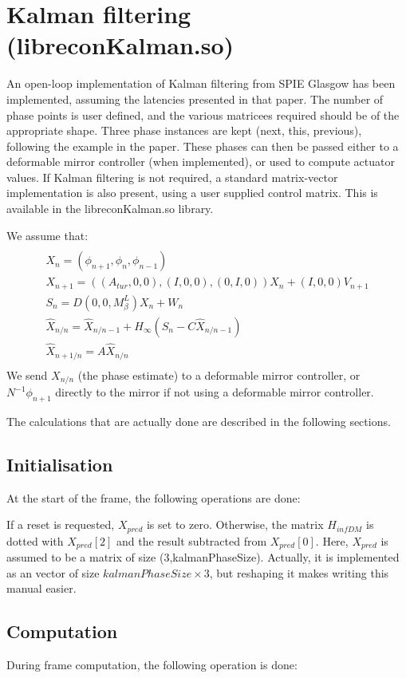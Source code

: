 \documentclass[a4,10pt]{article}
\begin{document}
\section{Kalman filtering (libreconKalman.so)}
\label{sect:kalman}
An open-loop implementation of Kalman filtering from SPIE Glasgow has
been implemented, assuming the latencies presented in that paper.  The
number of phase points is user defined, and the various matricees
required should be of the appropriate shape.  Three phase instances
are kept (next, this, previous), following the example in the paper.
These phases can then be passed either to a deformable mirror
controller (when implemented), or used to compute actuator values.  If
Kalman filtering is not required, a standard matrix-vector
implementation is also present, using a user supplied control matrix.
This is available in the libreconKalman.so library.


We assume that:
\begin{multline}\\
X_n=(\phi_{n+1},\phi_{n},\phi_{n-1})\\
X_{n+1} = ((A_{tur}, 0, 0), (I, 0, 0), (0, I, 0)) X_n + (I, 0, 0)
V_{n+1}\\
S_n = D (0, 0, M_\beta^L) X_n + W_n\\
\hat{X}_{n/n} = \hat{X}_{n/n-1} + H_\infty (S_n -C\hat{X}_{n/n-1})\\
\hat{X}_{n+1/n} = A\hat{X}_{n/n}\\
\end{multline}
We send $X_{n/n}$ (the phase estimate) to a deformable mirror
controller, or $N^{-1} \phi_{n+1}$ directly to the mirror if not using
a deformable mirror controller.

The calculations that are actually done are described in the following
sections.  

\subsection{Initialisation}
At the start of the frame, the following operations are done:

If a reset is requested, $X_{pred}$ is set to zero.  Otherwise, the matrix
$H_{infDM}$ is dotted with $X_{pred}[2]$ and the result subtracted from
$X_{pred}[0]$.  Here, $X_{pred}$ is assumed to be a matrix of size
(3,kalmanPhaseSize).  Actually, it is implemented as an vector of size
$kalmanPhaseSize\times 3$, but reshaping it makes writing this manual easier.


\subsection{Computation}
During frame computation, the following operation is done:
\end{document}
